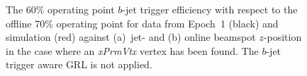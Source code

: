 \begin{figure}[!ht]
\begin{center}
  \end{center}
  \vspace{-1em}
  \caption[The $b$-jet trigger efficiency for data from Epoch~1 and simulation against jet-\pT{} and online beamspot $z$-position when a \textit{xPrmVtx} vertex has been found.
    The $b$-jet trigger aware GRL is not applied.]
          {The 60\% operating point $b$-jet trigger efficiency with respect to the offline 70\% operating point
            for data from Epoch~1 (black) and simulation (red) against (a)~jet-\pT{} and (b) online beamspot $z$-position in the case where an \textit{xPrmVtx} vertex has been found.
            The $b$-jet trigger aware GRL is not applied.}
    \label{fig:Epoch1_PVFound}
\end{figure}





